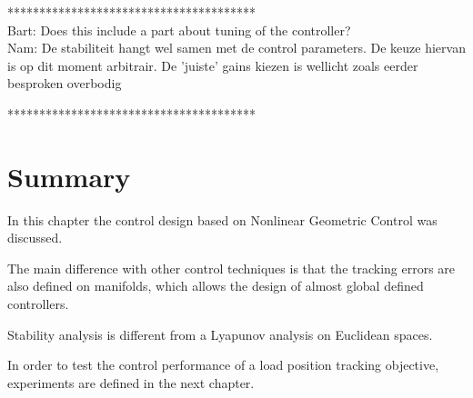 ***************************************\\
Bart: Does this include a part about tuning of the controller?\\
Nam: De stabiliteit hangt wel samen met de control parameters. De keuze hiervan is op dit moment arbitrair. De 'juiste' gains kiezen is wellicht zoals eerder besproken overbodig 

***************************************\\

\section*{Summary}

In this chapter the control design based on Nonlinear Geometric Control was discussed.

The main difference with other control techniques is that the tracking errors are also defined on manifolds, which allows the design of almost global defined controllers.

Stability analysis is different from a Lyapunov analysis on Euclidean spaces.


In order to test the control performance of a load position tracking objective, experiments are defined in the next chapter. 




